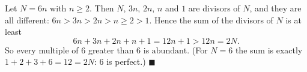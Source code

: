 Let $N=6n$ with $n\ge2$. Then $N$, $3n$, $2n$, $n$ and $1$ are divisors of $N$, and they are all different: $6n>3n>2n>n\ge2>1$. Hence the sum of the divisors of $N$ is at least
\[
6n+3n+2n+n+1=12n+1>12n=2N .
\]
So every multiple of $6$ greater than $6$ is $\boxed{\text{abundant}}$. (For $N=6$ the sum is exactly $1+2+3+6=12=2N$: $6$ is perfect.) $\blacksquare$
